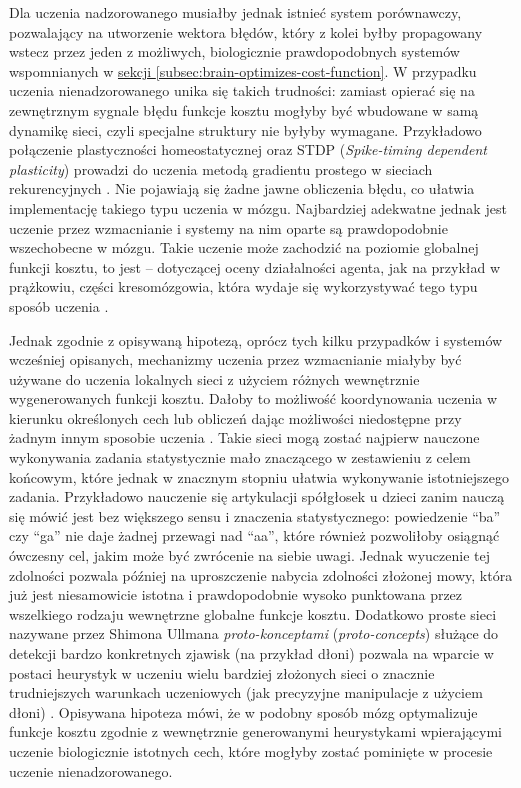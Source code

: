 Dla uczenia nadzorowanego musiałby jednak istnieć system porównawczy, pozwalający na utworzenie wektora błędów, który z kolei byłby propagowany wstecz przez jeden z możliwych, biologicznie prawdopodobnych systemów wspomnianych w \hyperref[subsec:brain-optimizes-cost-function]{sekcji \ref*{subsec:brain-optimizes-cost-function}}.
W przypadku uczenia nienadzorowanego unika się takich trudności: zamiast opierać się na zewnętrznym sygnale błędu funkcje kosztu mogłyby być wbudowane w samą dynamikę sieci, czyli specjalne struktury nie byłyby wymagane.
Przykładowo połączenie plastyczności homeostatycznej oraz STDP (\emph{Spike-timing dependent plasticity}) prowadzi do uczenia metodą gradientu prostego w sieciach rekurencyjnych \cite{galtier2013biological}.
Nie pojawiają się żadne jawne obliczenia błędu, co ułatwia implementację takiego typu uczenia w mózgu.
Najbardziej adekwatne jednak jest uczenie przez wzmacnianie i systemy na nim oparte są prawdopodobnie wszechobecne w mózgu.
Takie uczenie może zachodzić na poziomie globalnej funkcji kosztu, to jest -- dotyczącej oceny działalności agenta, jak na przykład w prążkowiu, części kresomózgowia, która wydaje się wykorzystywać tego typu sposób uczenia \cite{o2014goal}.

Jednak zgodnie z opisywaną hipotezą, oprócz tych kilku przypadków i systemów wcześniej opisanych,  mechanizmy uczenia przez wzmacnianie miałyby być używane do uczenia lokalnych sieci z użyciem różnych wewnętrznie wygenerowanych funkcji kosztu.
Dałoby to możliwość koordynowania uczenia w kierunku określonych cech lub obliczeń dając możliwości niedostępne przy żadnym innym sposobie uczenia \cite{ullman2012simple}.
Takie sieci mogą zostać najpierw nauczone wykonywania zadania statystycznie mało znaczącego w zestawieniu z celem końcowym, które jednak w znacznym stopniu ułatwia wykonywanie istotniejszego zadania.
Przykładowo nauczenie się artykulacji spółgłosek u dzieci zanim nauczą się mówić jest bez większego sensu i znaczenia statystycznego: powiedzenie ``ba'' czy ``ga'' nie daje żadnej przewagi nad ``aa'', które również pozwoliłoby osiągnąć ówczesny cel, jakim może być zwrócenie na siebie uwagi.
Jednak wyuczenie tej zdolności pozwala później na uproszczenie nabycia zdolności złożonej mowy, która już jest niesamowicie istotna i prawdopodobnie wysoko punktowana przez wszelkiego rodzaju wewnętrzne globalne funkcje kosztu.
Dodatkowo proste sieci nazywane przez Shimona Ullmana \emph{proto-konceptami} (\emph{proto-concepts}) służące do detekcji bardzo konkretnych zjawisk (na przykład dłoni) pozwala na wparcie w postaci heurystyk w uczeniu wielu bardziej złożonych sieci o znacznie trudniejszych warunkach uczeniowych (jak precyzyjne manipulacje z użyciem dłoni) \cite{ullman2012simple}.
Opisywana hipoteza mówi, że w podobny sposób mózg optymalizuje funkcje kosztu zgodnie z wewnętrznie generowanymi heurystykami wpierającymi uczenie biologicznie istotnych cech, które mogłyby zostać pominięte w procesie uczenie nienadzorowanego.

